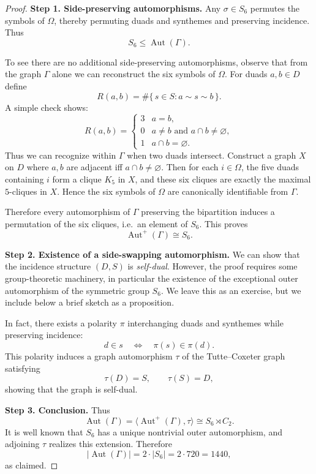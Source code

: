 \documentclass[12pt,a4paper,openany]{book}
\begin{document}
\begin{proof}
\textbf{Step 1. Side-preserving automorphisms.}
Any $\sigma \in S_6$ permutes the symbols of $\Omega$, thereby permuting duads and synthemes and preserving incidence. Thus
\[
  S_6 \leq \operatorname{Aut}(\Gamma).
\]

To see there are no additional side-preserving automorphisms, observe that from the graph $\Gamma$ alone we can reconstruct the six symbols of $\Omega$.  
For duads $a,b\in D$ define
\[
  R(a,b) = \#\{\, s\in S : a\sim s \sim b \,\}.
\]
A simple check shows:
\[
  R(a,b) = 
  \begin{cases}
    3 & a=b,\\
    0 & a\neq b \text{ and } a\cap b\neq \varnothing,\\
    1 & a\cap b=\varnothing.
  \end{cases}
\]
Thus we can recognize within $\Gamma$ when two duads intersect.  
Construct a graph $X$ on $D$ where $a,b$ are adjacent iff $a\cap b\neq \varnothing$.  
Then for each $i\in \Omega$, the five duads containing $i$ form a clique $K_5$ in $X$, and these six cliques are exactly the maximal $5$-cliques in $X$. Hence the six symbols of $\Omega$ are canonically identifiable from $\Gamma$.

Therefore every automorphism of $\Gamma$ preserving the bipartition induces a permutation of the six cliques, i.e.\ an element of $S_6$. This proves
\[
  \operatorname{Aut}^+(\Gamma) \cong S_6.
\]

\textbf{Step 2. Existence of a side-swapping automorphism.}
\medskip
\noindent
We can show that the incidence structure \((D,S)\) is \emph{self-dual}. 
However, the proof requires some group-theoretic machinery, in particular 
the existence of the exceptional outer automorphism of the symmetric group \(S_6\). 
We leave this as an exercise, but we include below a brief sketch as a proposition.

\medskip
\noindent
In fact, there exists a polarity \(\pi\) interchanging duads and synthemes 
while preserving incidence:
\[
d \in s \quad \Longleftrightarrow \quad \pi(s) \in \pi(d).
\]
This polarity induces a graph automorphism \(\tau\) of the Tutte--Coxeter graph 
satisfying
\[
\tau(D) = S, \qquad \tau(S) = D,
\]
showing that the graph is self-dual.

\textbf{Step 3. Conclusion.}
Thus
\[
  \operatorname{Aut}(\Gamma) = \langle \operatorname{Aut}^+(\Gamma), \tau\rangle \cong S_6 \rtimes C_2.
\]
It is well known that $S_6$ has a unique nontrivial outer automorphism, and adjoining $\tau$ realizes this extension. Therefore
\[
  |\operatorname{Aut}(\Gamma)| = 2\cdot |S_6| = 2\cdot 720 = 1440,
\]
as claimed.
\end{proof}
\end{document}
